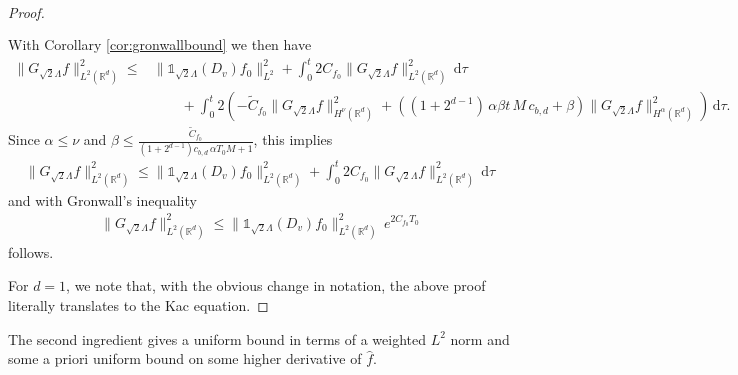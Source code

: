 \documentclass[11pt,a4paper,reqno]{amsart}
\theoremstyle{plain}
\theoremstyle{definition}
\begin{document}
\begin{proof}
\begin{align}
\begin{split}
	\end{split}
 	\end{align}
With Corollary \ref{cor:gronwallbound} we then have
    \begin{align*}
    	\|G_{\sqrt{2}\Lambda}f\|_{L^2({\mathbb{R}}^d)}^2 \leq &\|{\mathds{1}}_{\sqrt{2}\Lambda}(D_v)f_0\|_{L^2}^2 + \int_0^t 2 C_{f_0} \|G_{\sqrt{2}\Lambda}f\|_{L^2({\mathbb{R}}^d)}^2 \, \mathrm{d}\tau \\
    	&\qquad+\int_0^t 2 \left(- \widetilde{C}_{f_0} \|G_{\sqrt{2}\Lambda}f\|_{H^{\nu}({\mathbb{R}}^d)}^2
	  + \left((1+2^{d-1})\, \alpha \beta t \, M \, c_{b,d} + \beta\right) \|G_{\sqrt{2}\Lambda} f\|_{H^{\alpha}({\mathbb{R}}^d)}^2  \right)\, \mathrm{d}\tau .
    \end{align*}
    Since $\alpha\leq\nu$ and $\beta \le \frac{\widetilde{C}_{f_0}}{(1+2^{d-1}) c_{b,d} \, \alpha T_0 M + 1}$, this implies
    \begin{align*}
    \|G_{\sqrt{2}\Lambda}f\|_{L^2({\mathbb{R}}^d)}^2 \leq \|{\mathds{1}}_{\sqrt{2}\Lambda}(D_v)f_0\|_{L^2({\mathbb{R}}^d)}^2 + \int_0^t 2C_{f_0} \|G_{\sqrt{2}\Lambda} f\|_{L^2({\mathbb{R}}^d)}^2 \, \mathrm{d}\tau
    \end{align*}
    and with Gronwall's inequality
    \begin{align}\label{eq:gronwall-final}
    	\|G_{\sqrt{2}\Lambda}f\|_{L^2({\mathbb{R}}^d)}^2 \leq \|{\mathds{1}}_{\sqrt{2}\Lambda}(D_v) f_0\|_{L^2({\mathbb{R}}^d)}^2 \, e^{2C_{f_0} T_0} 
    \end{align}
  follows.

  For $d=1$, we note that, with the obvious change in notation, the above proof literally translates to the Kac equation.
\end{proof}

The second ingredient gives a uniform bound in terms of a weighted $L^2$ norm and some a priori uniform bound on some higher derivative of $\hat{f}$.
\end{document}
